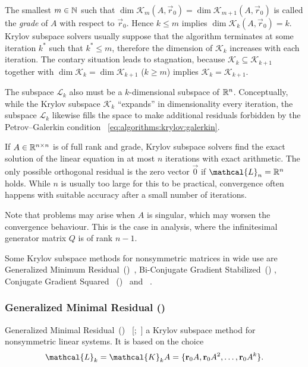 The smallest $m \in \mathbb{N}$ such that
$\dim \mathcal{K}_m(A, \vec{r}_0) = \dim \mathcal{K}_{m + 1}(A,
\vec{r}_0)$
is called the \emph{grade} of $A$ with respect to $\vec{r}_0$. Hence
$k \le m$ implies $\dim \mathcal{K}_k(A, \vec{r}_0) = k$. Krylov
subspace solvers usually suppose that the algorithm terminates at some
iteration $k^*$ such that $k^* \le m$, therefore the dimension of
$\mathcal{K}_k$ increases with each iteration. The contary situation
leads to stagnation, because
$\mathcal{K}_k \subseteq \mathcal{K}_{k + 1}$ together with
$\dim \mathcal{K}_k = \dim \mathcal{K}_{k + 1}$ ($k \ge m$) implies
$\mathcal{K}_k = \mathcal{K}_{k + 1}$.

The subspace $\mathcal{L}_k$ also must be a $k$-dimensional subspace
of $\mathbb{R}^n$. Conceptually, while the Krylov subspace $\mathcal{K}_k$
``expands'' in dimensionality every iteration, the subspace
$\mathcal{L}_k$ likewise fills the space to make additional residuals
forbidden by the Petrov--Galerkin condition~%
\eqref{eq:algorithms:krylov:galerkin}.

If $A \in \mathbb{R}^{n \times n}$ is of full rank and grade, Krylov subspace
solvers find the exact solution of the linear equation in at most $n$
iterations with exact arithmetic. The only possible orthogonal
residual is the zero vector $\vec{0}$ if $\mathcal{L}_n = \RR^n$
holds. While $n$ is usually too large for this to be practical,
convergence often happens with suitable accuracy after a small number
of iterations.

Note that problems may arise when $A$ is singular, which may worsen
the convergence behaviour. This is the case in  analysis,
where the infinitesimal generator matrix $Q$ is of rank $n - 1$.

Some Krylov subspace methods for nonsymmetric matrices in wide use are
Generalized Minimum Residual~()~\citep{saad1986gmres},
Bi-Conjugate Gradient Stabilized~()
\citep{van1992bi}, Conjugate Gradient Squared%
~()~\citep{sonneveld1989cgs} and
~\citep{sonneveld2008idr}.

\subsubsection{Generalized Minimal Residual ()}
\label{ssec:algorithms:gmres}

Generalized Minimal Residual~()%
~\mkbibbrackets{;~}
a Krylov subspace method for nonsymmetric linear systems. It is based
on the choice
\begin{equation}
  \label{eq:algorithms:gmres:lspace}
  \mathcal{L}_k = \mathcal{K}_k A = \{ \vec{r}_0A, \vec{r}_0A^2,
  \ldots, \vec{r}_0 A^k \} \text.
\end{equation}

